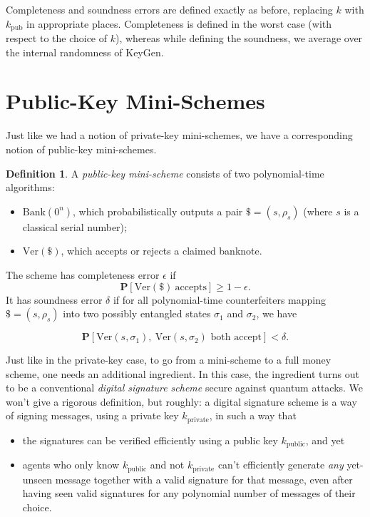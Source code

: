 \documentclass[12pt]{report}
\theoremstyle{plain}
\theoremstyle{definition}
\newtheorem{definition}[theorem]{Definition}
\renewcommand{\Pr}{\mathbf{P}}
\begin{document}
Completeness and soundness errors are defined exactly as before, replacing $k$ with $k_{\text{pub}}$ in appropriate places.  Completeness is defined in the worst case (with respect to the choice of $k$), whereas while defining the soundness, we average over the internal randomness of KeyGen.

\section{Public-Key Mini-Schemes}

Just like we had a notion of private-key mini-schemes, we have a corresponding notion of public-key mini-schemes.

\begin{definition} \label{def:public_mini}
A {\em public-key mini-scheme} consists of two polynomial-time algorithms:
\begin{itemize}
\item $\text{Bank}(0^n)$, which probabilistically outputs a pair $\$ = (s, \rho_s)$ (where $s$ is a classical serial number);
\item $\text{Ver}(\$)$, which accepts or rejects a claimed banknote.
\end{itemize}
\end{definition}
The scheme has completeness error $\epsilon$ if
$$
\Pr[\text{Ver}(\$)\ \text{accepts}] \geq 1-\epsilon.
$$
It has soundness error $\delta$ if for all polynomial-time counterfeiters mapping $\$ = (s,\rho_s)$ into two possibly entangled states $\sigma_1$ and $\sigma_2$, we have

$$\Pr[\text{Ver}(s,\sigma_1),\ \text{Ver}(s,\sigma_2)\text{ both accept}] < \delta.$$

Just like in the private-key case, to go from a mini-scheme to a full money scheme, one needs an additional ingredient.  In this case, the ingredient turns out to be a conventional {\em digital signature scheme} secure against quantum attacks.  We won't give a rigorous definition, but roughly: a digital signature scheme is a way of signing messages, using a private key $k_{\text{private}}$, in such a way that
\begin{itemize}
\item the signatures can be verified efficiently using a public key $k_{\text{public}}$, and yet
\item agents who only know $k_{\text{public}}$ and not $k_{\text{private}}$ can't efficiently generate {\em any} yet-unseen message together with a valid signature for that message, even after having seen valid signatures for any polynomial number of messages of their choice.
\end{itemize}
\end{document}
